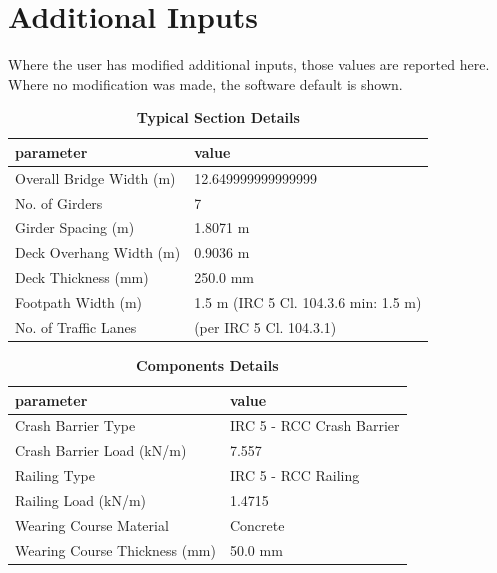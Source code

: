 \documentclass[12pt,a4paper]{report}
\numberwithin{table}{chapter}
\numberwithin{figure}{chapter}
\begin{document}
\newpage
\section{Additional Inputs}
\label{sec:additional-inputs}

Where the user has modified additional inputs, those values are reported here. Where no modification was made, the software default is shown.

\vspace{0.8cm}

\begin{longtable}{|L{5.5cm}|p{10.0cm}|}
\caption{\textbf{Typical Section Details}}
\hline
\textbf{parameter} & \textbf{value} \\
\hline
\textnormal{Overall Bridge Width (m)} & 12.649999999999999 \\[6pt]
\hline
\textnormal{No. of Girders} & 7 \\[6pt]
\hline
\textnormal{Girder Spacing (m)} & 1.8071 m \\[6pt]
\hline
\textnormal{Deck Overhang Width (m)} & 0.9036 m \\[6pt]
\hline
\textnormal{Deck Thickness (mm)} & 250.0 mm \\[6pt]
\hline
\textnormal{Footpath Width (m)} & 1.5 m (IRC 5 Cl. 104.3.6 min: 1.5 m) \\[6pt]
\hline
\textnormal{No. of Traffic Lanes} &  (per IRC 5 Cl. 104.3.1) \\[6pt]
\hline
\end{longtable}

\vspace{0.8em}

\begin{longtable}{|L{5.5cm}|p{10.0cm}|}
\caption{\textbf{Components Details}}
\hline
\textbf{parameter} & \textbf{value} \\
\hline
\textnormal{Crash Barrier Type} & IRC 5 - RCC Crash Barrier \\[6pt]
\hline
\textnormal{Crash Barrier Load (kN/m)} & 7.557 \\[6pt]
\hline

\textnormal{Railing Type} & IRC 5 - RCC Railing \\[6pt]
\hline
\textnormal{Railing Load (kN/m)} & 1.4715 \\[6pt]
\hline
\textnormal{Wearing Course Material} & Concrete \\[6pt]
\hline
\textnormal{Wearing Course Thickness (mm)} & 50.0 mm \\[6pt]
\hline
\end{longtable}
\end{document}
